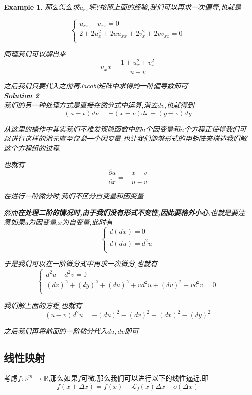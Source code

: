 \documentclass[11pt,hyperref,a4paper,UTF8]{ctexart}
\newtheorem{example}{Example}[subsection]
\newcommand{\RR}{\mathbb{R}}
\begin{document}
\begin{CJK}{UTF8}{gkai}
\begin{example}
  那么怎么求$u_{xx}$呢?按照上面的经验,我们可以再求一次偏导,也就是

  \[\begin{cases}
    u_{xx} + v_{xx} = 0\\
    2 + 2 u_x^2 + 2 u u_{xx} + 2 v_x^2 + 2 v v_{xx} = 0\\
  \end{cases}\]

  同理我们可以解出来
  \[u_xx = \frac{1 + u_x^2 + v_x^2}{u - v}\]

  之后我们只要代入之前再Jacobi矩阵中求得的一阶偏导数即可\\

  \textbf{Solution 2}\\

  我们的另一种处理方式是直接在微分式中运算,消去$dv$,也就得到
  \[(u - v)du = -(x - v)dx - (y - v)dy\]

  从这里的操作中其实我们不难发现隐函数中的$n$个因变量和$n$个方程正使得我们可以进行这样的消元直至仅剩一个因变量,也让我们能够形式的用矩阵来描述我们解这个方程组的过程.
  
  也就有
  \[\frac{\partial u}{\partial x} = -\frac{x - v}{u - v}\]

  在进行一阶微分时,我们不区分自变量和因变量

  然而\textbf{在处理二阶的情况时,由于我们没有形式不变性,因此要格外小心},也就是要注意如果$u$为因变量,$x$为自变量,此时有
  \[\begin{cases}
    d(dx) = 0\\
    d(du) = d^2 u\\
  \end{cases}\]

  于是我们可以在一阶微分式中再求一次微分,也就有
  \[\begin{cases}
    d^2 u + d^2 v = 0\\
    (dx)^2 + (dy)^2 + (du)^2 + u d^2 u + (dv)^2 + v d^2 v= 0\\
  \end{cases}\]

  我们解上面的方程,也就有
  \[(u -v)d^2 u = - (du)^2 - (dv)^2 - (dx)^2 - (dy)^2\]

  之后我们再将前面的一阶微分代入$du,dv$即可
  
\end{example}

\subsection{线性映射}
考虑$f : \RR^m \to \RR$,那么如果$f$可微,那么我们可以进行以下的线性逼近,即
\[f(x + \Delta x) = f(x) + \mathcal{L}_{f}(x) \Delta x + o(\Delta x)\]


\end{CJK}
\end{document}
